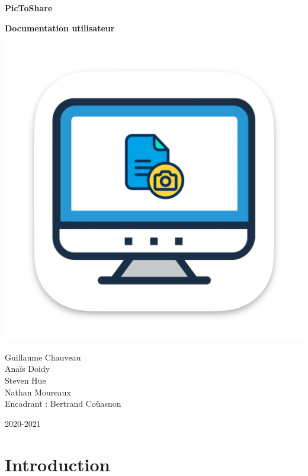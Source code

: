 \documentclass[a4paper,11pt]{article}
\begin{document}
	\begin{titlepage}
		\begin{center}
			\vspace{0.5cm}

			\Huge
			\textbf{PicToShare}

			\vspace{0.5cm}
			\textbf{Documentation utilisateur}

			\includegraphics[width=\textwidth]{PTS_icon}

			\Large
			Guillaume Chauveau \\
			Anaïs Doidy \\
			Steven Hue \\
			Nathan Moureaux\\

			\vspace{1cm}
			Encadrant : Bertrand Coüasnon

			\vspace{1cm}
			2020-2021

		\end{center}

	\end{titlepage}


	\section{Introduction}
\end{document}
